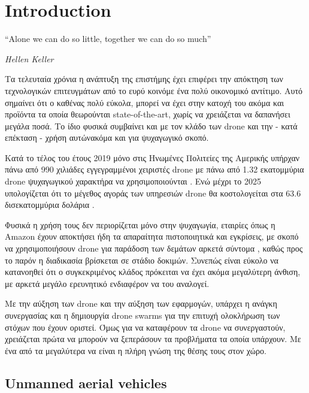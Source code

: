 \chapter{Introduction} %
\label{chap:Chapter1}  %
\epigraph{``Alone we can do so little, together we can do so much” }{\textit{Hellen Keller}}


Τα τελευταία χρόνια η ανάπτυξη της επιστήμης έχει επιφέρει την απόκτηση των τεχνολογικών επιτευγμάτων 
από το ευρύ κοινό\udot με ένα πολύ οικονομικό αντίτιμο. Αυτό σημαίνει ότι ο καθένας πολύ εύκολα, μπορεί 
να έχει στην κατοχή του ακόμα και προϊόντα τα οποία θεωρούνται state-of-the-art, χωρίς να χρειάζεται να 
δαπανήσει μεγάλα ποσά. Το ίδιο φυσικά συμβαίνει και με τον κλάδο των drone και την - κατά επέκταση - χρήση 
αυτών\udot ακόμα και για ψυχαγωγικό σκοπό.  

Κατά το τέλος του έτους 2019 μόνο στις Ηνωμένες Πολιτείες της Αμερικής υπήρχαν πάνω από 990 χιλιάδες 
εγγεγραμμένοι χειριστές drone με πάνω από 1.32 εκατομμύρια drone ψυχαγωγικού χαρακτήρα να χρησιμοποιούνται 
\cite{2019-drone-statistic}. Ενώ μέχρι το 2025 υπολογίζεται ότι το μέγεθος αγοράς των υπηρεσιών drone θα 
κοστολογείται στα 63.6 δισεκατομμύρια δολάρια \cite{expected-drone-market}.

Φυσικά η χρήση τους δεν περιορίζεται μόνο στην ψυχαγωγία, εταιρίες όπως η Amazon έχουν αποκτήσει ήδη τα 
απαραίτητα πιστοποιητικά και εγκρίσεις, με σκοπό να χρησιμοποιήσουν drone για παράδοση των δεμάτων αρκετά 
σύντομα \cite{amazon-drones}, καθώς προς το παρόν η διαδικασία βρίσκεται σε στάδιο δοκιμών. Συνεπώς είναι 
εύκολο να κατανοηθεί ότι ο συγκεκριμένος κλάδος πρόκειται να έχει ακόμα μεγαλύτερη άνθιση, με αρκετά μεγάλο 
ερευνητικό ενδιαφέρον να του αναλογεί.   

Με την αύξηση των drone και την αύξηση των εφαρμογών, υπάρχει η ανάγκη συνε\-ργασίας και η δημιουργία drone swarms 
για την επιτυχή ολοκλήρωση των στόχων που έχουν οριστεί. Όμως για να καταφέρουν τα drone να συνεργαστούν, χρειάζεται 
πρώτα να μπορούν να ξεπεράσουν τα προβλήματα τα οποία υπάρχουν. Με ένα από τα μεγαλύτερα να είναι η πλήρη γνώση της 
θέσης τους στον χώρο.

\newpage

\section{Unmanned aerial vehicles} \label{sec:Chapter1-1} 


